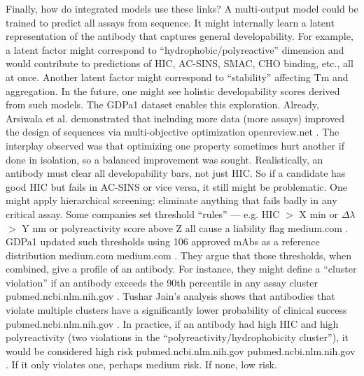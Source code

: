\documentclass[12pt]{article}
\begin{document}
Finally, how do integrated models use these links? A multi-output model could be trained to predict all assays from sequence. It might internally learn a latent representation of the antibody that captures general developability. For example, a latent factor might correspond to “hydrophobic/polyreactive” dimension and would contribute to predictions of HIC, AC-SINS, SMAC, CHO binding, etc., all at once. Another latent factor might correspond to “stability” affecting Tm and aggregation. In the future, one might see holistic developability scores derived from such models. The GDPa1 dataset enables this exploration. Already, Arsiwala et al. demonstrated that including more data (more assays) improved the design of sequences via multi-objective optimization
openreview.net
. The interplay observed was that optimizing one property sometimes hurt another if done in isolation, so a balanced improvement was sought. Realistically, an antibody must clear all developability bars, not just HIC. So if a candidate has good HIC but fails in AC-SINS or vice versa, it still might be problematic. One might apply hierarchical screening: eliminate anything that fails badly in any critical assay. Some companies set threshold “rules” — e.g. HIC $>$ X min or $\Delta\lambda$ $>$ Y nm or polyreactivity score above Z all cause a liability flag
medium.com
. GDPa1 updated such thresholds using 106 approved mAbs as a reference distribution
medium.com
medium.com
. They argue that those thresholds, when combined, give a profile of an antibody. For instance, they might define a “cluster violation” if an antibody exceeds the 90th percentile in any assay cluster
pubmed.ncbi.nlm.nih.gov
. Tushar Jain’s analysis shows that antibodies that violate multiple clusters have a significantly lower probability of clinical success
pubmed.ncbi.nlm.nih.gov
. In practice, if an antibody had high HIC and high polyreactivity (two violations in the “polyreactivity/hydrophobicity cluster”), it would be considered high risk
pubmed.ncbi.nlm.nih.gov
pubmed.ncbi.nlm.nih.gov
. If it only violates one, perhaps medium risk. If none, low risk.
\end{document}
